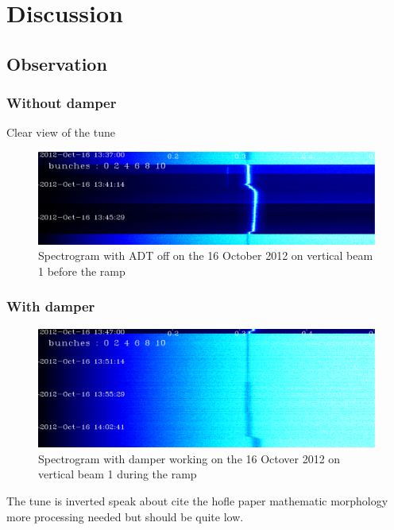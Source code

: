 
\chapter{Discussion}

\section{Observation}

	\subsection{Without damper}

	Clear view of the tune

\begin{figure}[H]
\caption{Spectrogram with ADT off on the 16 October 2012 on vertical beam 1 before the ramp}
\centering
\includegraphics[scale=0.3]{md-121016-vb1-m1-6bunches-10acc-1337-1349-ADT-off.pdf}
\end{figure}

	\subsection{With damper}

\begin{figure}[H]
\caption{Spectrogram with damper working on the 16 Octover 2012 on vertical beam 1 during the ramp}
\centering
\includegraphics[scale=0.3]{md-121016-vb1-m1-6bunches-10acc-1347-1405-ramp.pdf}
\end{figure}

	The tune is inverted speak about cite the hofle paper mathematic morphology more processing needed but should be quite low.

